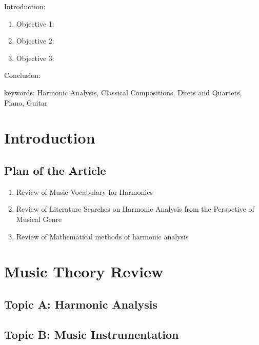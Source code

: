 


\twocolumn
\scriptsize
\begin{frontmatter}
		\title{}
		\author{}
		\address{The Mathematical Learning Space}
\end{frontmatter}	

Introduction:
\begin{enumerate}
\item Objective 1:
\item Objective 2:
\item Objective 3:
\end{enumerate}
Conclusion:

keywords: Harmonic Analysis, Classical Compositions, Duets and Quartets, Piano, Guitar


\section{Introduction}

\subsection{Plan of the Article}

\begin{enumerate}
\item Review of Music Vocabulary for Harmonics
\item Review of Literature Searches on Harmonic Analysis from the Perspetive of Musical Genre
\item Review of Mathematical methods of harmonic analysis
\end{enumerate}

\section{Music Theory Review}

\subsection{Topic A: Harmonic Analysis}

\subsection{Topic B: Music Instrumentation}


